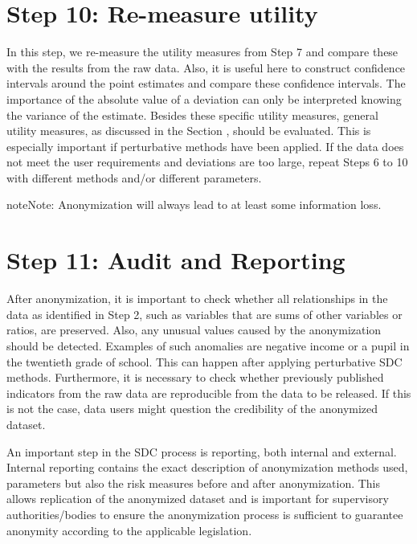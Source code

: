 \documentclass[letterpaper,10pt,english]{sphinxmanual}
\begin{document}
\section{Step 10: Re-measure utility}
\label{\detokenize{process:step-10-re-measure-utility}}
In this step, we re-measure the utility measures from Step 7 and compare
these with the results from the raw data. Also, it is useful here to
construct confidence intervals around the point estimates and compare
these confidence intervals. The importance of the absolute value of a
deviation can only be interpreted knowing the variance of the estimate.
Besides these specific utility measures, general utility measures, as
discussed in the Section
, should be evaluated. This is especially
important if perturbative methods have been applied. If the data does
not meet the user requirements and deviations are too large, repeat
Steps 6 to 10 with different methods and/or different parameters.

\begin{sphinxadmonition}{note}{Note:}
Anonymization will always lead to at least some information loss.
\end{sphinxadmonition}


\section{Step 11: Audit and Reporting}
\label{\detokenize{process:step-11-audit-and-reporting}}
After anonymization, it is important to check whether all relationships
in the data as identified in Step 2, such as variables that are sums of
other variables or ratios, are preserved. Also, any unusual values
caused by the anonymization should be detected. Examples of such
anomalies are negative income or a pupil in the twentieth grade of
school. This can happen after applying perturbative SDC methods.
Furthermore, it is necessary to check whether previously published
indicators from the raw data are reproducible from the data to be
released. If this is not the case, data users might question the
credibility of the anonymized dataset.

An important step in the SDC process is reporting, both internal and
external. Internal reporting contains the exact description of
anonymization methods used, parameters but also the risk measures before
and after anonymization. This allows replication of the anonymized
dataset and is important for supervisory authorities/bodies to ensure
the anonymization process is sufficient to guarantee anonymity according
to the applicable legislation.
\end{document}
